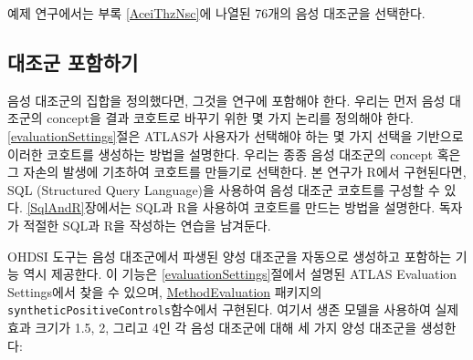 \documentclass[11pt]{book}
\theoremstyle{definition}
\theoremstyle{definition}
\theoremstyle{definition}
\theoremstyle{remark}
\begin{document}
예제 연구에서는 부록 \ref{AceiThzNsc}에 나열된 76개의 음성 대조군을
선택한다.

\subsection{대조군 포함하기}\label{-}

음성 대조군의 집합을 정의했다면, 그것을 연구에 포함해야 한다. 우리는
먼저 음성 대조군의 concept을 결과 코호트로 바꾸기 위한 몇 가지 논리를
정의해야 한다. \ref{evaluationSettings}절은 ATLAS가 사용자가 선택해야
하는 몇 가지 선택을 기반으로 이러한 코호트를 생성하는 방법을 설명한다.
우리는 종종 음성 대조군의 concept 혹은 그 자손의 발생에 기초하여
코호트를 만들기로 선택한다. 본 연구가 R에서 구현된다면, SQL (Structured
Query Language)을 사용하여 음성 대조군 코호트를 구성할 수 있다.
\ref{SqlAndR}장에서는 SQL과 R을 사용하여 코호트를 만드는 방법을
설명한다. 독자가 적절한 SQL과 R을 작성하는 연습을 남겨둔다.

OHDSI 도구는 음성 대조군에서 파생된 양성 대조군을 자동으로 생성하고
포함하는 기능 역시 제공한다. 이 기능은 \ref{evaluationSettings}절에서
설명된 ATLAS Evaluation Settings에서 찾을 수 있으며,
\href{https://ohdsi.github.io/MethodEvaluation/}{MethodEvaluation}
패키지의 \texttt{syntheticPositiveControls}함수에서 구현된다. 여기서
생존 모델을 사용하여 실제 효과 크기가 1.5, 2, 그리고 4인 각 음성
대조군에 대해 세 가지 양성 대조군을 생성한다:
\end{document}
